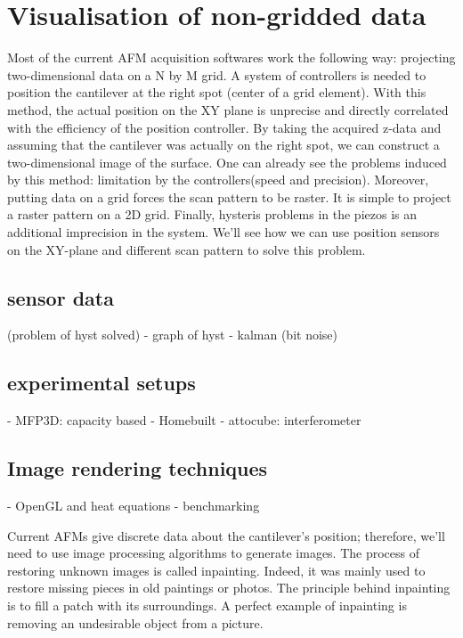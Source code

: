 \chapter{Visualisation of non-gridded data}

Most of the current AFM acquisition softwares work the following way: projecting two-dimensional data on a N by M grid. A system of controllers is needed to position the cantilever at the right spot (center of a grid element). With this method, the actual position on the XY plane is unprecise and directly correlated with the efficiency of the position controller. By taking the acquired z-data and assuming that the cantilever was actually on the right spot, we can construct a two-dimensional image of the surface. One can already see the problems induced by this method: limitation by the controllers(speed and precision). Moreover, putting data on a grid forces the scan pattern to be raster. It is simple to project a raster pattern on a 2D grid. Finally, hysteris problems in the piezos is an additional imprecision in the system. We'll see how we can use position sensors on the XY-plane and different scan pattern to solve this problem.

\section{sensor data}

(problem of hyst solved)
	- graph of hyst
	- kalman (bit noise)

\section{experimental setups}
	- MFP3D: capacity based
	- Homebuilt
		- attocube: interferometer

\section{Image rendering techniques}
- OpenGL and heat equations
	- benchmarking


Current AFMs give discrete data about the cantilever's position; therefore, we'll need to use image processing algorithms to generate images. The process of restoring unknown images is called inpainting. Indeed, it was mainly used to restore missing pieces in old paintings or photos. The principle behind inpainting is to fill a patch with its surroundings. A perfect example of inpainting is removing an undesirable object from a picture. 



